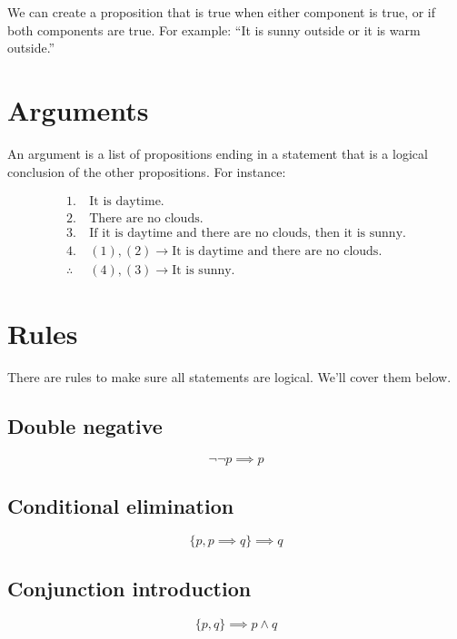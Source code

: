 \documentclass[a4paper,10pt]{report}
\begin{document}
We can create a proposition that is true when either component is true, or if
both components are true. For example: ``It is sunny outside or it is warm
outside.''

\section{Arguments}

An argument is a list of propositions ending in a statement that is a logical
conclusion of the other propositions. For instance:

\begin{align*}
 1.~&\text{It is daytime.} \\
 2.~&\text{There are no clouds.} \\
 3.~&\text{If it is daytime and there are no clouds, then it is sunny.} \\
 \hline
 4.~&(1), (2) \to \text{It is daytime and there are no clouds.} \\
 \hline
 \therefore~&(4), (3) \to \text{It is sunny.}
\end{align*}

\section{Rules}

There are rules to make sure all statements are logical. We'll cover them below.

\subsection{Double negative}
\begin{equation*}
 \lnot\lnot p \implies p
\end{equation*}

\subsection{Conditional elimination}
\begin{equation*}
 \{p, p \implies q\} \implies q
\end{equation*}

\subsection{Conjunction introduction}

\begin{equation*}
 \{p, q\} \implies p \land q
\end{equation*}
\end{document}
